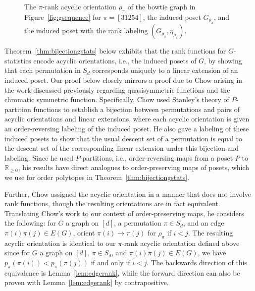 \documentclass[11pt]{amsart}
\newcommand{\rk}[1][\pi]{p_{#1}}
\begin{document}
\begin{figure}
    \caption{The $\pi$-rank acyclic orientation $\rho_\pi$ of the bowtie graph in Figure~\ref{fig:gsequence} for $\pi=[31254]$, the induced poset $G_{\rho_\pi}$, and the induced poset with the rank labeling $(G_{\rho_\pi},\eta_{\rho_\pi})$.}
    \label{fig:pirankposet}
\end{figure}

Theorem~\ref{thm:bijectiongstats} below exhibits that the rank functions for $G$-statistics encode acyclic orientations, i.e., the induced posets of $G$, by showing that each permutation in $S_d$ corresponds uniquely to a linear extension of an induced poset.
Our proof below closely mirrors a proof due to Chow \cite{chow1999} arising in the work discussed previously regarding quasisymmetric functions and the chromatic symmetric function.
Specifically, Chow used Stanley's \cite{stanleychromatic} theory of $P$-partition functions to establish a bijection between permutations and pairs of acyclic orientations and linear extensions, where each acyclic orientation is given an order-reversing labeling of the induced poset.
He also gave a labeling of these induced posets to show that the usual descent set of a permutation is equal to the descent set of the corresponding linear extension under this bijection and labeling.
Since he used $P$-partitions, i.e., order-reversing maps from a poset $P$ to $\mathbb{R}_{\geq 0}$, his results
have direct analogues to order-preserving maps of posets, which we use for order polytopes in Theorem~\ref{thm:bijectiongstats}. 

Further, Chow assigned the acyclic orientation in a manner that does not involve rank functions, though the resulting orientations are in fact equivalent.
Translating Chow's work to our context of order-preserving maps, he considers the following: for $G$ a graph on $[d]$, a permutation $\pi \in S_d$, and an edge $\pi(i)\pi(j) \in E(G)$, orient $\pi(i) \to \pi(j)$ for $\rho_\pi$ if $i <j$.
The resulting acyclic orientation is identical to our $\pi$-rank acyclic orientation defined above since for $G$ a graph on $[d]$, $\pi \in S_d$, and $\pi(i)\pi(j) \in E(G)$, we have $\rk(\pi(i)) < \rk(\pi(j))$ if and only if $i <j$. 
The backwards direction of this equivalence is Lemma~\ref{lem:edgerank}, while the forward direction can also be proven with Lemma~\ref{lem:edgerank} by contrapositive. 
\end{document}
